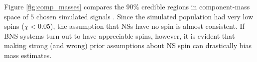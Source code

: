 Figure \ref{fig:comp_masses} compares the $90\%$ credible regions in component-mass space of $5$ chosen simulated signals \citep[cf.][figure 1]{Chatziioannou_2014}.  Since the simulated population had very low spins ($\chi < 0.05$), the assumption that NSs have no spin is almost consistent.  If BNS systems turn out to have appreciable spins, however, it is evident that making strong (and wrong) prior assumptions about NS spin can drastically bias mass estimates.